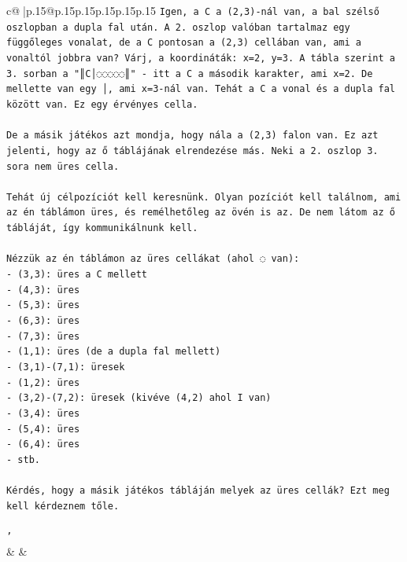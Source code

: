 \documentclass{article}
\begin{document}
{\begin{supertabular}{c@{$\;$}|p{.15\linewidth}@{}p{.15\linewidth}p{.15\linewidth}p{.15\linewidth}p{.15\linewidth}p{.15\linewidth}}
{{{\texttt{Igen, a C a (2,3){-}nál van, a bal szélső oszlopban a dupla fal után. A 2. oszlop valóban tartalmaz egy függőleges vonalat, de a C pontosan a (2,3) cellában van, ami a vonaltól jobbra van? Várj, a koordináták: x=2, y=3. A tábla szerint a 3. sorban a "║C│◌◌◌◌◌║" {-} itt a C a második karakter, ami x=2. De mellette van egy │, ami x=3{-}nál van. Tehát a C a vonal és a dupla fal között van. Ez egy érvényes cella.} \\
\\ 
\texttt{De a másik játékos azt mondja, hogy nála a (2,3) falon van. Ez azt jelenti, hogy az ő táblájának elrendezése más. Neki a 2. oszlop 3. sora nem üres cella. } \\
\\ 
\texttt{Tehát új célpozíciót kell keresnünk. Olyan pozíciót kell találnom, ami az én táblámon üres, és remélhetőleg az övén is az. De nem látom az ő tábláját, így kommunikálnunk kell.} \\
\\ 
\texttt{Nézzük az én táblámon az üres cellákat (ahol ◌ van):} \\
\texttt{{-} (3,3): üres a C mellett} \\
\texttt{{-} (4,3): üres} \\
\texttt{{-} (5,3): üres} \\
\texttt{{-} (6,3): üres} \\
\texttt{{-} (7,3): üres} \\
\texttt{{-} (1,1): üres (de a dupla fal mellett)} \\
\texttt{{-} (3,1){-}(7,1): üresek} \\
\texttt{{-} (1,2): üres} \\
\texttt{{-} (3,2){-}(7,2): üresek (kivéve (4,2) ahol I van)} \\
\texttt{{-} (3,4): üres} \\
\texttt{{-} (5,4): üres} \\
\texttt{{-} (6,4): üres} \\
\texttt{{-} stb.} \\
\\ 
\texttt{Kérdés, hogy a másik játékos tábláján melyek az üres cellák? Ezt meg kell kérdeznem tőle.} \\
\\ 
\texttt{'} \\
            }
        }
    }
    & & \\ \\


\end{supertabular}}
\end{document}
